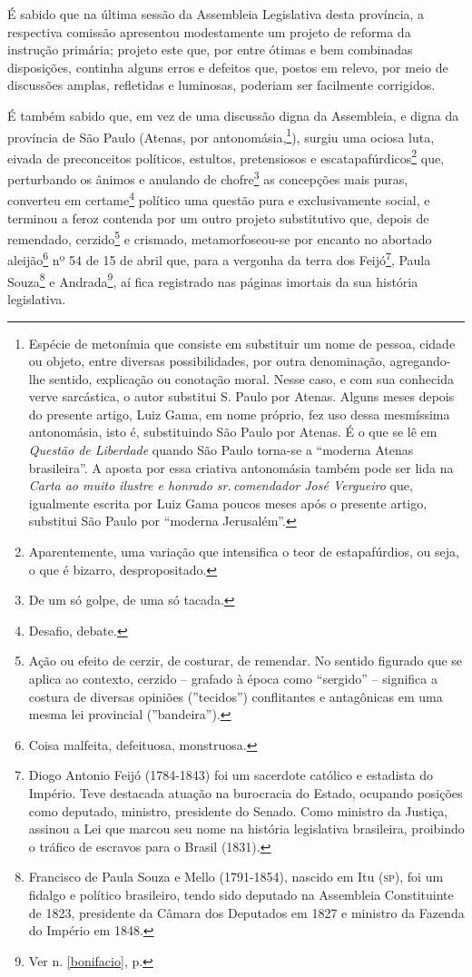 É sabido que na última sessão da Assembleia Legislativa desta província,
a respectiva comissão apresentou modestamente um projeto de reforma da
instrução primária; projeto este que, por entre ótimas e bem combinadas
disposições, continha alguns erros e defeitos que, postos em relevo, por
meio de discussões amplas, refletidas e luminosas, poderiam ser
facilmente corrigidos.

É também sabido que, em vez de uma discussão digna da Assembleia, e
digna da província de São Paulo (Atenas, por antonomásia,\footnote{
  Espécie de metonímia que consiste em substituir um nome de pessoa,
  cidade ou objeto, entre diversas possibilidades, por outra
  denominação, agregando-lhe sentido, explicação ou conotação moral.
  Nesse caso, e com sua conhecida verve sarcástica, o autor substitui S.
  Paulo por Atenas. Alguns meses depois do presente artigo, Luiz Gama,
  em nome próprio, fez uso dessa mesmíssima antonomásia, isto é,
  substituindo São Paulo por Atenas. É o que se lê em \emph{Questão de
  Liberdade} quando São Paulo torna-se a ``moderna Atenas brasileira''. A
  aposta por essa criativa antonomásia também pode ser lida na
  \emph{Carta ao muito ilustre e honrado sr.\,comendador José Vergueiro}
  que, igualmente escrita por Luiz Gama poucos meses após o presente
  artigo, substitui São Paulo por ``moderna Jerusalém''.}), surgiu uma
ociosa luta, eivada de preconceitos políticos, estultos, pretensiosos e
escatapafúrdicos\footnote{Aparentemente, uma variação que intensifica
  o teor de estapafúrdios, ou seja, o que é bizarro, despropositado.}
que, perturbando os ânimos e anulando de chofre\footnote{De um só
  golpe, de uma só tacada.} as concepções mais puras, converteu em
certame\footnote{Desafio, debate.} político uma questão pura e
exclusivamente social, e terminou a feroz contenda por um outro projeto
substitutivo que, depois de remendado, cerzido\footnote{Ação ou efeito
  de cerzir, de costurar, de remendar. No sentido figurado que se aplica
  ao contexto, cerzido -- grafado à época como ``sergido'' -- significa a
  costura de diversas opiniões (''tecidos'') conflitantes e antagônicas em
  uma mesma lei provincial (''bandeira'').} e crismado, metamorfoseou-se
por encanto no abortado aleijão\footnote{Coisa malfeita, defeituosa,
  monstruosa.} nº 54 de 15 de abril que, para a vergonha da terra dos
Feijó\footnote{Diogo Antonio Feijó (1784-1843) foi um sacerdote
  católico e estadista do Império. Teve destacada atuação na burocracia
  do Estado, ocupando posições como deputado, ministro, presidente do
  Senado. Como ministro da Justiça, assinou a Lei que marcou seu nome na
  história legislativa brasileira, proibindo o tráfico de escravos para
  o Brasil (1831).}, Paula Souza\footnote{Francisco de Paula Souza e
  Mello (1791-1854), nascido em Itu (\textsc{sp}), foi um fidalgo e político
  brasileiro, tendo sido deputado na Assembleia Constituinte de 1823,
  presidente da Câmara dos Deputados em 1827 e ministro da Fazenda do
  Império em 1848.} e Andrada\footnote{Ver n. \ref{bonifacio}, p. \pageref{bonifacio}}, 
  aí fica registrado nas páginas imortais da sua história legislativa.

